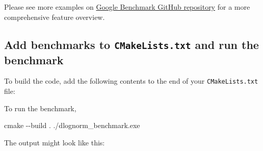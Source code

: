 \documentclass[
]{book}
\newenvironment{Shaded}{\begin{snugshade}}{\end{snugshade}}
\newcommand{\AttributeTok}[1]{\textcolor[rgb]{0.77,0.63,0.00}{#1}}
\newcommand{\DataTypeTok}[1]{\textcolor[rgb]{0.13,0.29,0.53}{#1}}
\newcommand{\DecValTok}[1]{\textcolor[rgb]{0.00,0.00,0.81}{#1}}
\newcommand{\ExtensionTok}[1]{#1}
\newcommand{\FunctionTok}[1]{\textcolor[rgb]{0.00,0.00,0.00}{#1}}
\newcommand{\KeywordTok}[1]{\textcolor[rgb]{0.13,0.29,0.53}{\textbf{#1}}}
\newcommand{\NormalTok}[1]{#1}
\newcommand{\OtherTok}[1]{\textcolor[rgb]{0.56,0.35,0.01}{#1}}
\begin{document}
Please see more examples on \href{https://github.com/google/benchmark}{Google Benchmark GitHub repository} for a more comprehensive feature overview.

\hypertarget{add-benchmarks-to-cmakelists.txt-and-run-the-benchmark}{%
\subsection{\texorpdfstring{Add benchmarks to \texttt{CMakeLists.txt} and run the benchmark}{Add benchmarks to CMakeLists.txt and run the benchmark}}\label{add-benchmarks-to-cmakelists.txt-and-run-the-benchmark}}

To build the code, add the following contents to the end of your \texttt{CMakeLists.txt} file:

\begin{Shaded}
\end{Shaded}

To run the benchmark,

\begin{Shaded}
\begin{Highlighting}[]
\FunctionTok{cmake} \AttributeTok{{-}{-}build}\NormalTok{ .}
\ExtensionTok{./dlognorm\_benchmark.exe}
\end{Highlighting}
\end{Shaded}

The output might look like this:
\end{document}
